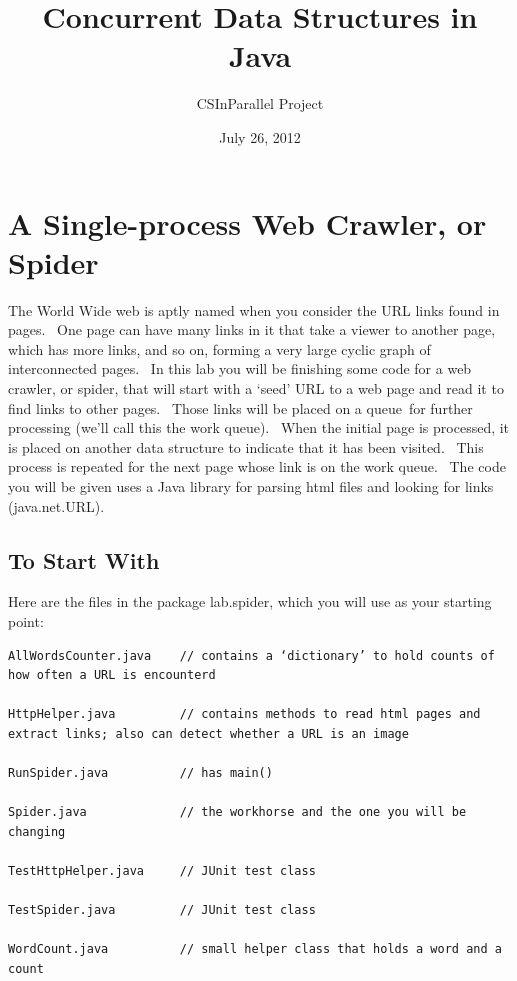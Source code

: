 \documentclass[letterpaper,10pt,openany,oneside]{sphinxmanual}
\title{Concurrent Data Structures in Java}
\date{July 26, 2012}
\author{CSInParallel Project}
\begin{document}
\maketitle
\tableofcontents
{}\label{index::doc}



\chapter{A Single-process Web Crawler, or Spider}
\label{TheSpiderLabonecrawler/TheSpiderLabonecrawler::doc}\label{TheSpiderLabonecrawler/TheSpiderLabonecrawler:concurrent-data-structures-in-java}\label{TheSpiderLabonecrawler/TheSpiderLabonecrawler:a-single-process-web-crawler-or-spider}
The World Wide web is aptly named when you consider the URL links
found in pages.  One page can have many links in it that take a
viewer to another page, which has more links, and so on, forming a
very large cyclic graph of interconnected pages.  In this lab you
will be finishing some code for a web crawler, or spider, that will
start with a ‘seed’ URL to a web page and read it to find links to
other pages.  Those links will be placed on a queue for further
processing (we’ll call this the work queue).  When the initial page
is processed, it is placed on another data structure to indicate
that it has been visited.  This process is repeated for the next
page whose link is on the work queue.  The code you will be given
uses a Java library for parsing html files and looking for links
(java.net.URL).


\section{To Start With}
\label{TheSpiderLabonecrawler/TheSpiderLabonecrawler:to-start-with}
Here are the files in the package lab.spider, which you will use as
your starting point:

\begin{Verbatim}[commandchars=\\\{\}]
AllWordsCounter.java    // contains a ‘dictionary’ to hold counts of how often a URL is encounterd

HttpHelper.java         // contains methods to read html pages and extract links; also can detect whether a URL is an image

RunSpider.java          // has main()

Spider.java             // the workhorse and the one you will be changing

TestHttpHelper.java     // JUnit test class

TestSpider.java         // JUnit test class

WordCount.java          // small helper class that holds a word and a count
\end{Verbatim}
\end{document}
